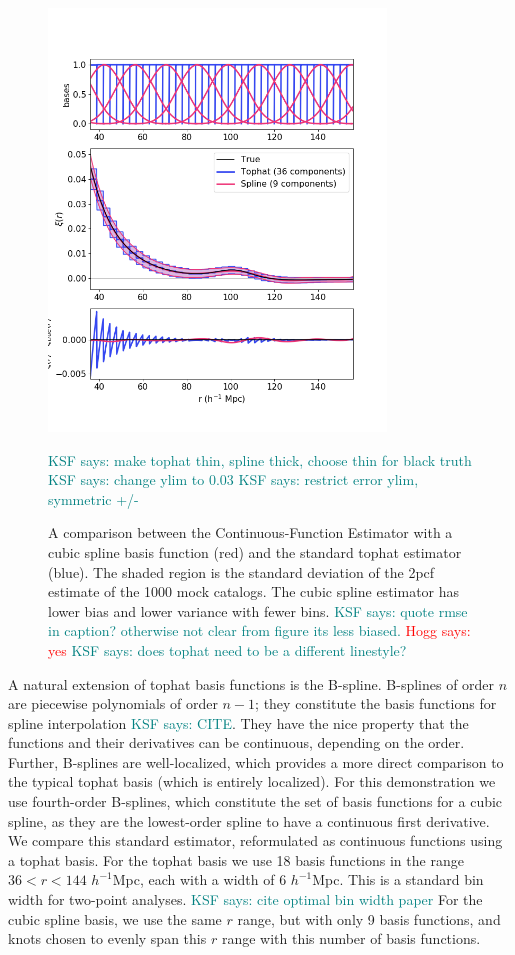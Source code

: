 \documentclass[modern]{aastex62}
\newcommand{\cf}{2pcf\xspace} %
\newcommand{\est}{the Continuous-Function Estimator\xspace}
\newcommand{\hmpc}{$h^{-1}$Mpc}
\newcommand{\KSF}[1]{\textcolor{teal}{KSF says: #1}}
\newcommand{\hogg}[1]{\textcolor{red}{Hogg says: #1}}
\begin{document}
\label{fig:spline}
\begin{figure}[ht]
\centering
    \includegraphics[width=0.8\textwidth]{xicomparison_2e-4_tophat3_spline}
    \caption{A comparison between \est with a cubic spline basis function (red) and the standard tophat estimator (blue). The shaded region is the standard deviation of the \cf estimate of the 1000 mock catalogs. The cubic spline estimator has lower bias and lower variance with fewer bins. \KSF{quote rmse in caption? otherwise not clear from figure its less biased.} \hogg{yes} \KSF{does tophat need to be a different linestyle?}} \KSF{make tophat thin, spline thick, choose thin for black truth} \KSF{change ylim to 0.03} \KSF{restrict error ylim, symmetric +/-}

\end{figure}

A natural extension of tophat basis functions is the B-spline.
B-splines of order $n$ are piecewise polynomials of order $n-1$; they constitute the basis functions for spline interpolation \KSF{CITE}.
They have the nice property that the functions and their derivatives can be continuous, depending on the order.
Further, B-splines are well-localized, which provides a more direct comparison to the typical tophat basis (which is entirely localized).
For this demonstration we use fourth-order B-splines, which constitute the set of basis functions for a cubic spline, as they are the lowest-order spline to have a continuous first derivative.
We compare this standard estimator, reformulated as continuous functions using a tophat basis.
For the tophat basis we use 18 basis functions in the range $36 < r < 144$ \hmpc, each with a width of 6 \hmpc.
This is a standard bin width for two-point analyses. \KSF{cite optimal bin width paper}
For the cubic spline basis, we use the same $r$ range, but with only 9 basis functions, and knots chosen to evenly span this $r$ range with this number of basis functions.
\end{document}
